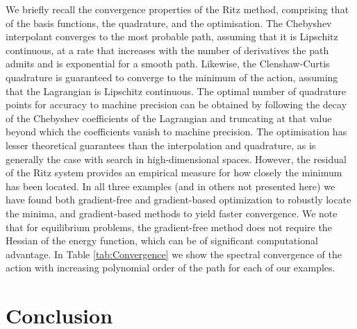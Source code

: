 We briefly recall the convergence properties of the Ritz method, comprising
that of the basis functions, the quadrature, and the optimisation.
The Chebyshev interpolant converges to the most probable
path, assuming that it is Lipschitz continuous, at a rate that increases
with the number of derivatives the path admits and is exponential
for a smooth path. Likewise, the Clenshaw-Curtis quadrature is guaranteed
to converge to the minimum of the action, assuming that the Lagrangian
is Lipschitz continuous. The optimal number of quadrature points for
accuracy to machine precision can be obtained by following the decay
of the Chebyshev coefficients of the Lagrangian and truncating at
that value beyond which the coefficients vanish to machine precision.
The optimisation has lesser theoretical guarantees than the interpolation
and quadrature, as is generally the case with search in high-dimensional
spaces. However, the residual of the Ritz system provides an empirical
measure for how closely the minimum has been located. In all three
examples (and in others not presented here) we have found both gradient-free
and gradient-based optimization to robustly locate the minima, and
gradient-based methods to yield faster convergence. We note that for
equilibrium problems, the gradient-free method does not require the
Hessian of the energy function, which can be of significant computational
advantage. In Table \ref{tab:Convergence} we show the spectral convergence
of the action with increasing polynomial order of the path for each
of our examples. 

\section{Conclusion}

